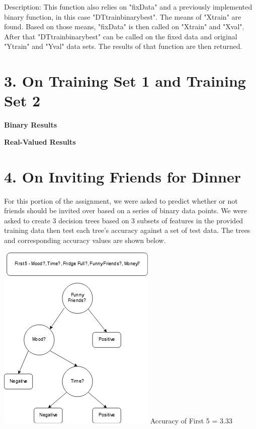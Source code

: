 \documentclass{article}
\begin{document}
\indent Description: This function also relies on "fixData" and a previously implemented binary function, in this case "DT\textunderscore train\textunderscore binary\textunderscore best". The means of "X\textunderscore train" are found. Based on those means, "fixData" is then called on "X\textunderscore train" and "X\textunderscore val". After that "DT\textunderscore train\textunderscore binary\textunderscore best" can be called on the fixed data and original "Y\textunderscore train" and "Y\textunderscore val" data sets. The results of that function are then returned.

\section*{3. On Training Set 1 and Training Set 2}

\noindent \textbf{Binary Results}

\indent 

\noindent \textbf{Real-Valued Results}

\section*{4. On Inviting Friends for Dinner}

\noindent For this portion of the assignment, we were asked to predict whether or not friends should be invited over based on a series of binary data points. We were asked to create 3 decision trees based on 3 subsets of features in the provided training data then test each tree's accuracy against a set of test data. The trees and corresponding accuracy values are shown below.

\begin{center}
    \includegraphics[scale=1]{First.png}
    \newline \newline Accuracy of First 5 = 3.33%
\end{center}
\end{document}
